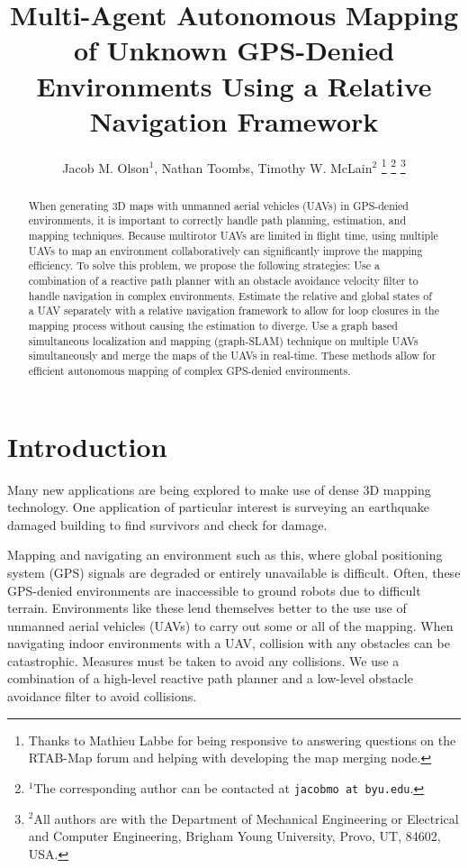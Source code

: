 \documentclass[letterpaper, 10 pt, conference]{ieeeconf}  %
\title{\LARGE \bf
Multi-Agent Autonomous Mapping of Unknown GPS-Denied Environments Using a Relative Navigation Framework}
\author{Jacob M. Olson$^{1}$, Nathan Toombs, Timothy W. McLain$^{2}$%
\footnote{Thanks to Mathieu Labbe for being responsive to answering questions on the RTAB-Map forum and helping with developing the map merging node.}%
\footnote{$^{1}$The corresponding author can be contacted at
        {\tt\small jacobmo at byu.edu}.}%
\footnote{$^{2}$All authors are with the Department of Mechanical Engineering or Electrical and Computer Engineering,
        Brigham Young University, Provo, UT, 84602, USA.}%
}
\begin{document}
\maketitle
\thispagestyle{empty}
\pagestyle{empty}


\begin{abstract}

When generating 3D maps with unmanned aerial vehicles (UAVs) in GPS-denied environments, it is important to correctly handle path planning, estimation, and mapping techniques. Because multirotor UAVs are limited in flight time, using multiple UAVs to map an environment collaboratively can significantly improve the mapping efficiency. To solve this problem, we propose the following strategies: Use a combination of a reactive path planner with an obstacle avoidance velocity filter to handle navigation in complex environments. Estimate the relative and global states of a UAV separately with a relative navigation framework to allow for loop closures in the mapping process without causing the estimation to diverge. Use a graph based simultaneous localization and mapping (graph-SLAM) technique on multiple UAVs simultaneously and merge the maps of the UAVs in real-time. These methods allow for efficient autonomous mapping of complex GPS-denied environments.

\end{abstract}


\section{Introduction}

Many new applications are being explored to make use of dense 3D mapping technology. One application of particular interest is surveying an earthquake damaged building to find survivors and check for damage.

Mapping and navigating an environment such as this, where global positioning system (GPS) signals are degraded or entirely unavailable is difficult. Often, these GPS-denied environments are inaccessible to ground robots due to difficult terrain. Environments like these lend themselves better to the use use of unmanned aerial vehicles (UAVs) to carry out some or all of the mapping. When navigating indoor environments with a UAV, collision with any obstacles can be catastrophic. Measures must be taken to avoid any collisions. We use a combination of a high-level reactive path planner and a low-level obstacle avoidance filter to avoid collisions.
\end{document}
